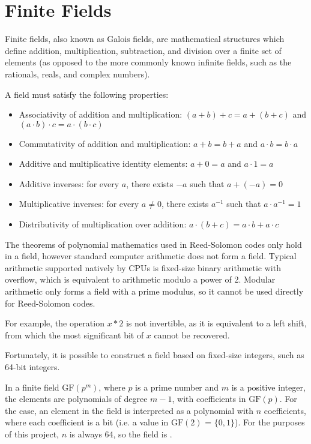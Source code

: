\section{Finite Fields}

Finite fields, also known as Galois fields, are mathematical structures which define addition, multiplication, subtraction, and division over a finite set of elements \cite{finite-fields-2nd-ed}
(as opposed to the more commonly known infinite fields, such as the rationals, reals, and complex numbers).

A field must satisfy the following properties:

\begin{itemize}[nosep]
    \item Associativity of addition and multiplication: $(a + b) + c = a + (b + c)$ and $(a \cdot b) \cdot c = a \cdot (b \cdot c)$
    \item Commutativity of addition and multiplication: $a + b = b + a$ and $a \cdot b = b \cdot a$
    \item Additive and multiplicative identity elements: $a + 0 = a$ and $a \cdot 1 = a$
    \item Additive inverses: for every $a$, there exists $-a$ such that $a + (-a) = 0$
    \item Multiplicative inverses: for every $a \neq 0$, there exists $a^{-1}$ such that $a \cdot a^{-1} = 1$
    \item Distributivity of multiplication over addition: $a \cdot (b + c) = a \cdot b + a \cdot c$
\end{itemize}

The theorems of polynomial mathematics used in Reed-Solomon codes only hold in a field, however standard computer arithmetic does not form a field.
Typical arithmetic supported natively by CPUs is fixed-size binary arithmetic with overflow, which is equivalent to arithmetic modulo a power of 2.
Modular arithmetic only forms a field with a prime modulus, so it cannot be used directly for Reed-Solomon codes.

For example, the operation $x * 2$ is not invertible, as it is equivalent to a left shift, from which the most significant bit of $x$ cannot be recovered.

Fortunately, it is possible to construct a field based on fixed-size integers, such as 64-bit integers.

In a finite field $\text{GF}(p^m)$, where $p$ is a prime number and $m$ is a positive integer, the elements are polynomials of degree $m - 1$, with coefficients in $\text{GF}(p)$.
For the  case, an element in the field is interpreted as a polynomial with $n$ coefficients, where each coefficient is a bit (i.e. a value in $\text{GF}(2)$ = $\{0, 1\}$).
For the purposes of this project, $n$ is always 64, so the field is .

